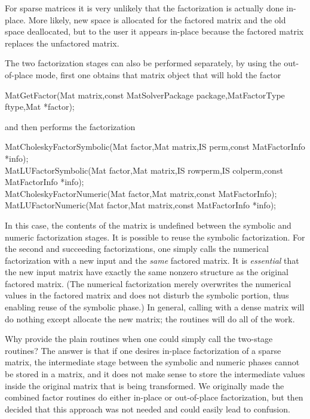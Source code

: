 {{{For sparse matrices it is very unlikely that the factorization
is actually done in-place. More likely, new space is allocated
for the factored matrix and the old space deallocated, but to the
user it appears in-place because the factored matrix replaces
the unfactored matrix.

The 
two
factorization
stages
can also be performed separately, by using the out-of-place mode, first
one obtains that matrix object that will hold the factor
\begin{tabbing}
  MatGetFactor(Mat matrix,const MatSolverPackage package,MatFactorType ftype,Mat *factor);
\end{tabbing}
and then performs the factorization
\begin{tabbing}
  MatCholeskyFactorSymbolic(Mat factor,Mat matrix,IS perm,const MatFactorInfo *info);\\
  MatLUFactorSymbolic(Mat factor,Mat matrix,IS rowperm,IS colperm,const MatFactorInfo *info);\\
  MatCholeskyFactorNumeric(Mat factor,Mat matrix,const MatFactorInfo);\\
  MatLUFactorNumeric(Mat factor,Mat matrix,const MatFactorInfo *info);
\end{tabbing}
In this case, the contents of the matrix  is undefined between
the symbolic and numeric factorization stages.
It is possible to reuse the symbolic factorization. For the second and
succeeding factorizations, one simply calls the numerical factorization with a
new input  and the {\em same} factored  matrix.
It is {\em essential} that the new input matrix
have   %
exactly the same nonzero structure as the original factored matrix.
(The numerical factorization merely overwrites the numerical values in the
factored matrix and does not disturb the symbolic portion, thus enabling
reuse of the symbolic phase.)
In general, calling  with a dense matrix will
do nothing except allocate the new matrix; the 
routines will do all of the work.

Why provide the plain  routines when one could simply
call the two-stage routines? The answer is that if one desires in-place
factorization of a sparse matrix, the intermediate stage between the
symbolic and numeric phases cannot be stored in a  matrix, and
it does not make sense to store the intermediate values
inside the original matrix
that is being transformed.  We originally made the combined factor routines
do either in-place or out-of-place factorization, but then decided that
this approach was not needed and could easily lead to confusion.

}}}
